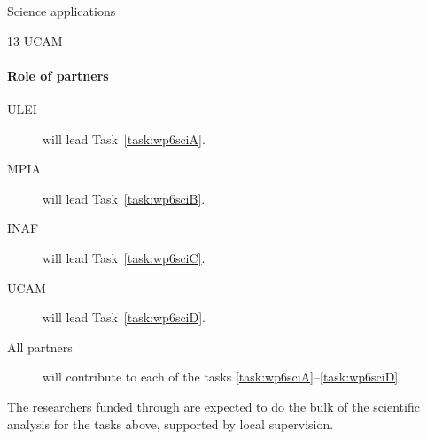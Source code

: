 \begin{workpackage}{Science applications}
\begin{wpdescription}
{      \textsf{13 UCAM \pems}
    }

    \paragraph{Role of partners}
    \begin{description}
      \item[ULEI] will lead Task~\ref{task:wp6sciA}.
      \item[MPIA] will lead Task~\ref{task:wp6sciB}.
      \item[INAF] will lead Task~\ref{task:wp6sciC}.
      \item[UCAM] will lead Task~\ref{task:wp6sciD}.
      \item[All partners] will contribute to each of the tasks \ref{task:wp6sciA}--\ref{task:wp6sciD}.
    \end{description}
    The researchers funded through {\acro} are expected to do the bulk of the scientific analysis for the tasks above, supported by local supervision.
  \end{wpdescription}

  \begin{wpdeliverables}
  \end{wpdeliverables}

\end{workpackage}



